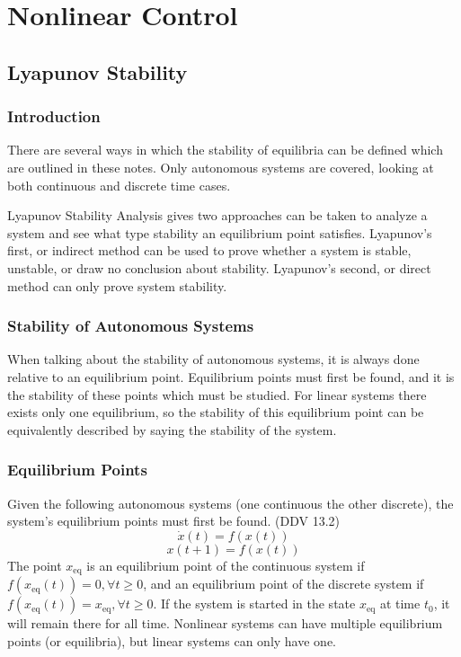 \chapter{Nonlinear Control}

\section{Lyapunov Stability}


\subsection{Introduction}

There are several ways in which the stability of equilibria can be defined which are outlined in these notes.
Only autonomous systems are covered, looking at both continuous and discrete time cases.

Lyapunov Stability Analysis gives two approaches can be taken to analyze a system and see what type stability an equilibrium point satisfies.
Lyapunov's first, or indirect method can be used to prove whether a system is stable, unstable, or draw no conclusion about stability.
Lyapunov's second, or direct method can only prove system stability.

\subsection{Stability of Autonomous Systems}

When talking about the stability of autonomous systems, it is always done relative to an equilibrium point.
Equilibrium points must first be found, and it is the stability of these points which must be studied.
For linear systems there exists only one equilibrium, so the stability of this equilibrium point can be equivalently described by saying the stability of the system.

\subsection{Equilibrium Points}

Given the following autonomous systems (one continuous the other discrete), the system's equilibrium points must first be found.
(DDV 13.2)
\begin{equation}
  \dot{x}(t)=f(x(t))
\end{equation}
\begin{equation}
  x(t+1)=f(x(t))
\end{equation}
The point $x_{\text{eq}}$ is an equilibrium point of the continuous system if  $f(x_{\text{eq}}(t))=0, \forall t\geq0$, and an equilibrium point of the discrete system if $f(x_{\text{eq}}(t))=x_{\text{eq}}, \forall t\geq0$.
If the system is started in the state $x_{\text{eq}}$ at time $t_{0}$, it will remain there for all time.
Nonlinear systems can have multiple equilibrium points (or equilibria), but linear systems can only have one.

